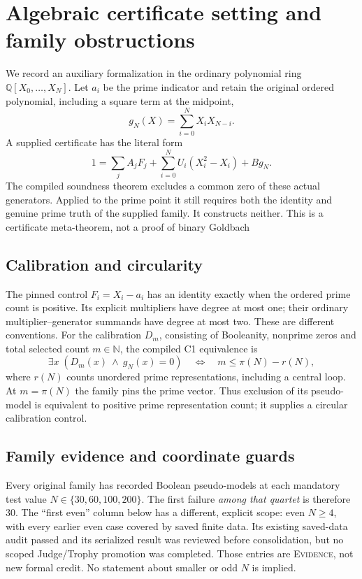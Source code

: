 \section{Algebraic certificate setting and family obstructions}
\label{sec:algebraic}
We record an auxiliary formalization in the ordinary polynomial ring
$\mathbb Q[X_0,\ldots,X_N]$. Let $a_i$ be the prime indicator and retain
the original ordered polynomial, including a square term at the midpoint,
\[
 g_N(X)=\sum_{i=0}^{N}X_iX_{N-i}.
\]
A supplied certificate has the literal form
\[
 1=\sum_j A_jF_j+\sum_{i=0}^{N}U_i(X_i^2-X_i)+Bg_N.
\]
The compiled soundness theorem excludes a common zero of these actual
generators. Applied to the prime point it still requires both the identity
and genuine prime truth of the supplied family. It constructs neither.
This is a certificate meta-theorem, not a proof of binary Goldbach

\subsection{Calibration and circularity}
The pinned control $F_i=X_i-a_i$ has an identity exactly when the ordered
prime count is positive. Its explicit multipliers have degree at most one;
their ordinary multiplier--generator summands have degree at most two.
These are different conventions. For the calibration $D_m$, consisting of
Booleanity, nonprime zeros and total selected count $m\in\mathbb N$, the
compiled C1 equivalence is
\[
 \exists x\;(D_m(x)\ \wedge\ g_N(x)=0)
 \quad\Longleftrightarrow\quad m\leq\pi(N)-r(N),
\]
where $r(N)$ counts unordered prime representations, including a central
loop. At $m=\pi(N)$ the family pins the prime vector. Thus exclusion of
its pseudo-model is equivalent to positive prime representation count;
it supplies a circular calibration control.

\subsection{Family evidence and coordinate guards}
Every original family has recorded Boolean pseudo-models at each mandatory
test value $N\in\{30,60,100,200\}$. The first failure \emph{among that quartet}
is therefore $30$. The ``first even'' column below has a different, explicit
scope: even $N\geq4$, with every earlier even case covered by saved finite
data. Its existing saved-data audit passed and its serialized result was
reviewed before consolidation, but no scoped Judge/Trophy promotion was
completed. Those entries are \textsc{Evidence}, not new formal credit.
No statement about smaller or odd $N$ is implied.

